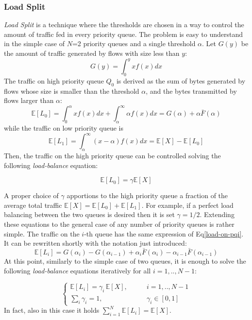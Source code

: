 \subsubsection{Load Split}
\emph{Load Split} is a technique where the thresholds are chosen in a way to control the amount of traffic fed in every priority queue.  The problem is easy to understand in the simple case of $N$=2 priority queues and a single threshold $\alpha$. Let $G(y)$ be the amount of traffic generated by flows with size less than $y$:
\[
G(y) = \int_{0}^y x f(x) dx
\]
The traffic on high priority queue $Q_0$ is derived as the sum of bytes generated by flows whose size is smaller than the threshold $\alpha$, and the bytes transmitted by flows larger than $\alpha$:
\[
\mathbb{E}[L_0] = \int_0^\alpha xf(x)dx+\int_\alpha^\infty \alpha f(x) dx=G(\alpha)+\alpha \bar{F}(\alpha)
\]
while the traffic on low priority queue is
\begin{equation*}
\mathbb{E}[L_1] =\int_\alpha^\infty (x-\alpha)f(x)dx=\mathbb{E}[X]-	\mathbb{E}[L_0]
\end{equation*}
Then, the traffic on the high priority queue can be controlled solving the following \textit{load-balance} equation:

\begin{equation}
\label{eq:main-gen}
\mathbb{E}[L_0] = \gamma \mathbb E[X] 
\end{equation}

A proper choice of $\gamma$ apportions to the high priority queue a fraction of the average total traffic $\mathbb{E}[X]  = \mathbb{E}[L_0] + \mathbb{E}[L_1]$. For example, if a perfect load balancing between the two queues is desired then it is set $\gamma = 1/2$.
Extending these equations to the general case of any number of priority queues is rather simple. The traffic on the $i$-th queue has the same expression of Eq\eqref{load-on-pqi}. It can be rewritten shortly with the notation just introduced:
\[
\mathbb{E}[L_i] = G(\alpha_i) - G(\alpha_{i-1}) + \alpha_i \bar{F}(\alpha_i) -\alpha_{i-1}\bar{F}(\alpha_{i-1})
\]
At this point, similarly to the simple case of two queues, it is enough to solve the following \emph{load-balance} equations iteratively for all $i = 1,..,N-1$:

\begin{equation}\label{eq:main-K-PQ}
\begin{cases}
\mathbb{E}[L_i] = \gamma_i \, \mathbb{E}[X],  \qquad &i = 1,..,N-1 \\
\sum_i \gamma_i = 1, \qquad &\gamma_i \in [0,1]
\end{cases}
\end{equation}
In fact, also in this case it holds $\sum_{i=1}^{N}\mathbb{E}[L_i] = \mathbb{E}[X]$.

